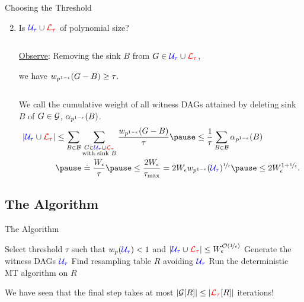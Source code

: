 \documentclass{beamer}
\def\spadding{\vspace{0.25cm}}
\newcommand*{\eqdef}{\overset{.}{=}}
\begin{document}
\begin{frame}{Choosing the Threshold}
\begin{enumerate}
    \setcounter{enumi}{1}
    \item Is $\textcolor{blue}{\mathcal{U}_\tau} \cup \textcolor{red}{\mathcal{L}_\tau}$ of polynomial size?\pause\vspace{0.25em}
    
    \begin{columns}[T]
    \begin{column}{0.42\textwidth}
    \underline{Observe}: Removing the sink $B$ from $G \in \textcolor{blue}{\mathcal{U}_\tau} \cup \textcolor{red}{\mathcal{L}_\tau}$,\par we have $w_{p^{1-\epsilon}}(G - B) \geq \tau$.\spadding
    
    \end{column}
    \begin{column}{0.1\textwidth}
    \centering\vspace{-2em}
    \end{column}
    \begin{column}{0\textwidth}
    \end{column}
    \end{columns}\pause\pause\pause\pause
    
    We call the cumulative weight of all witness DAGs attained by deleting sink $B$ of $G \in \mathcal{G}$, $\alpha_{p^{1-\epsilon}}(B)$.\pause\vspace{-0.25em}\begin{align*}
        |\U \cup \L| &\leq \sum_{B \in \B} \sum_{\substack{G \in \U \cup \L \\ \text{with sink $B$}}} \frac{\epsw(G - B)}{\tau} \pause\leq \frac{1}{\tau} \sum_{B \in \B} \epsalpha(B) \\
                     &\pause\eqdef \frac{\epsW}{\tau} \pause\leq \frac{2 \epsW}{\taumax} = 2 \epsW \epsw(\U)^{\nicefrac{1}{\epsilon}} \pause\leq 2 \epsW^{1+\nicefrac{1}{\epsilon}}.%
    \end{align*}
\end{enumerate}
\end{frame}

\subsection{The Algorithm}
\begin{frame}{The Algorithm}
\begin{algorithm}[H]
\pause
Select threshold $\tau$ such that $w_p(\textcolor{blue}{\mathcal{U}_\tau}) < 1$ and $|\textcolor{blue}{\mathcal{U}_\tau} \cup \textcolor{red}{\mathcal{L}_\tau}| \leq W_\epsilon^{\mathcal{O}(\nicefrac{1}{\epsilon})}$\;\pause
Generate the witness DAGs $\textcolor{blue}{\mathcal{U}_\tau}$\;\pause
Find resampling table $R$ avoiding $\textcolor{blue}{\mathcal{U}_\tau}$\;\pause
Run the deterministic MT algorithm on $R$\;
\end{algorithm}\pause\spadding

We have seen that the final step takes at most $|\mathcal{G}[R]| \leq |\textcolor{red}{\mathcal{L}_\tau}[R]|$ iterations!
\end{frame}
\end{document}
